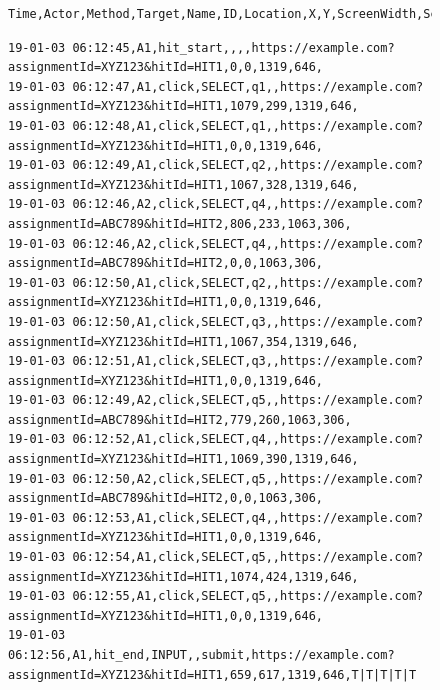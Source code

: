 \begin{figure}
\begin{lstlisting}[caption=Order of event components in Listing~\ref{lst:logs},label=lst:components]
Time,Actor,Method,Target,Name,ID,Location,X,Y,ScreenWidth,ScreenHeight,Comment
\end{lstlisting}
\begin{lstlisting}[basicstyle=\footnotesize\ttfamily,caption=Example log file capturing two user sessions at the same time. Note that there were far more interactions captured during the study and that this is a small contrived slice of the data. Much of the information from the URL has been redacted.,label=lst:logs]
19-01-03 06:12:45,A1,hit_start,,,,https://example.com?assignmentId=XYZ123&hitId=HIT1,0,0,1319,646,
19-01-03 06:12:47,A1,click,SELECT,q1,,https://example.com?assignmentId=XYZ123&hitId=HIT1,1079,299,1319,646,
19-01-03 06:12:48,A1,click,SELECT,q1,,https://example.com?assignmentId=XYZ123&hitId=HIT1,0,0,1319,646,
19-01-03 06:12:49,A1,click,SELECT,q2,,https://example.com?assignmentId=XYZ123&hitId=HIT1,1067,328,1319,646,
19-01-03 06:12:46,A2,click,SELECT,q4,,https://example.com?assignmentId=ABC789&hitId=HIT2,806,233,1063,306,
19-01-03 06:12:46,A2,click,SELECT,q4,,https://example.com?assignmentId=ABC789&hitId=HIT2,0,0,1063,306,
19-01-03 06:12:50,A1,click,SELECT,q2,,https://example.com?assignmentId=XYZ123&hitId=HIT1,0,0,1319,646,
19-01-03 06:12:50,A1,click,SELECT,q3,,https://example.com?assignmentId=XYZ123&hitId=HIT1,1067,354,1319,646,
19-01-03 06:12:51,A1,click,SELECT,q3,,https://example.com?assignmentId=XYZ123&hitId=HIT1,0,0,1319,646,
19-01-03 06:12:49,A2,click,SELECT,q5,,https://example.com?assignmentId=ABC789&hitId=HIT2,779,260,1063,306,
19-01-03 06:12:52,A1,click,SELECT,q4,,https://example.com?assignmentId=XYZ123&hitId=HIT1,1069,390,1319,646,
19-01-03 06:12:50,A2,click,SELECT,q5,,https://example.com?assignmentId=ABC789&hitId=HIT2,0,0,1063,306,
19-01-03 06:12:53,A1,click,SELECT,q4,,https://example.com?assignmentId=XYZ123&hitId=HIT1,0,0,1319,646,
19-01-03 06:12:54,A1,click,SELECT,q5,,https://example.com?assignmentId=XYZ123&hitId=HIT1,1074,424,1319,646,
19-01-03 06:12:55,A1,click,SELECT,q5,,https://example.com?assignmentId=XYZ123&hitId=HIT1,0,0,1319,646,
19-01-03 06:12:56,A1,hit_end,INPUT,,submit,https://example.com?assignmentId=XYZ123&hitId=HIT1,659,617,1319,646,T|T|T|T|T
\end{lstlisting}
\vspace{-8pt}
\end{figure}

\vspace{-8pt}
